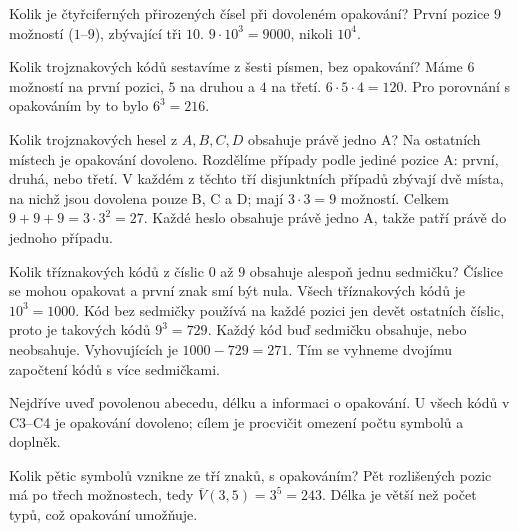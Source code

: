 \documentclass[11pt,a4paper]{article}
\begin{document}
\begin{prikladReseniBox}[title={Příklad P2}]
Kolik je čtyřciferných přirozených čísel při dovoleném opakování?
\tcblower
První pozice \(9\) možností (\(1\)--\(9\)), zbývající tři \(10\). \(9\cdot10^3=9000\), nikoli \(10^4\).
\end{prikladReseniBox}


\begin{prikladReseniBox}[title={Příklad P3}]
Kolik trojznakových kódů sestavíme z šesti písmen, bez opakování?
\tcblower
Máme \(6\) možností na první pozici, \(5\) na druhou a \(4\) na třetí. \(6\cdot5\cdot4=120\). Pro porovnání s opakováním by to bylo \(6^3=216\).
\end{prikladReseniBox}


\begin{prikladReseniBox}[title={Příklad P4}]
Kolik trojznakových hesel z $A,B,C,D$ obsahuje právě jedno A? Na ostatních místech je opakování dovoleno.
\tcblower
Rozdělíme případy podle jediné pozice A: první, druhá, nebo třetí. V každém z těchto tří disjunktních případů zbývají dvě místa, na nichž jsou dovolena pouze B, C a D; mají $3\cdot3=9$ možností. Celkem $9+9+9=3\cdot3^2=27$. Každé heslo obsahuje právě jedno A, takže patří právě do jednoho případu.
\end{prikladReseniBox}


\begin{prikladReseniBox}[title={Příklad P5}]
Kolik tříznakových kódů z číslic $0$ až $9$ obsahuje alespoň jednu sedmičku? Číslice se mohou opakovat a první znak smí být nula.
\tcblower
Všech tříznakových kódů je $10^3=1000$. Kód bez sedmičky používá na každé pozici jen devět ostatních číslic, proto je takových kódů $9^3=729$. Každý kód buď sedmičku obsahuje, nebo neobsahuje. Vyhovujících je $1000-729=271$. Tím se vyhneme dvojímu započtení kódů s více sedmičkami.
\end{prikladReseniBox}


\newpage
{}

Nejdříve uveď povolenou abecedu, délku a informaci o opakování. U všech kódů v C3–C4 je opakování dovoleno; cílem je procvičit omezení počtu symbolů a doplněk.

\begin{zadaniReseniBox}[title={Úloha C1}]
Kolik pětic symbolů vznikne ze tří znaků, s opakováním?
\tcblower
Pět rozlišených pozic má po třech možnostech, tedy $\overline V(3,5)=3^5=243$. Délka je větší než počet typů, což opakování umožňuje.
\end{zadaniReseniBox}
\end{document}
